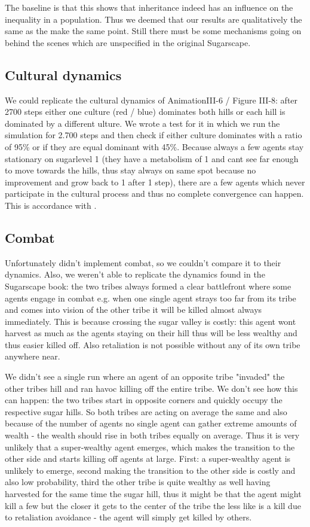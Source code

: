 The baseline is that this shows that inheritance indeed has an influence on the inequality in a population. Thus we deemed that our results are qualitatively the same as the make the same point. Still there must be some mechanisms going on behind the scenes which are unspecified in the original Sugarscape.

\subsection{Cultural dynamics}
We could replicate the cultural dynamics of AnimationIII-6 / Figure III-8: after 2700 steps either one culture (red / blue) dominates both hills or each hill is dominated by a different ulture. We wrote a test for it in which we run the simulation for 2.700 steps and then check if either culture dominates with a ratio of 95\% or if they are equal dominant with 45\%. Because always a few agents stay stationary on sugarlevel 1 (they have a metabolism of 1 and cant see far enough to move towards the hills, thus stay always on same spot because no improvement and grow back to 1 after 1 step), there are a few agents which never participate in the cultural process and thus no complete convergence can happen. This is accordance with \cite{weaver_replicating_2009}.

\subsection{Combat}
Unfortunately \cite{weaver_replicating_2009} didn't implement combat, so we couldn't compare it to their dynamics. Also, we weren't able to replicate the dynamics found in the Sugarscape book: the two tribes always formed a clear battlefront where some agents engage in combat e.g. when one single agent strays too far from its tribe and comes into vision of the other tribe it will be killed almost always immediately. This is because crossing the sugar valley is costly: this agent wont harvest as much as the agents staying on their hill thus will be less wealthy and thus easier killed off. Also retaliation is not possible without any of its own tribe anywhere near.

We didn't see a single run where an agent of an opposite tribe "invaded" the other tribes hill and ran havoc killing off the entire tribe. We don't see how this can happen: the two tribes start in opposite corners and quickly occupy the respective sugar hills. So both tribes are acting on average the same and also because of the number of agents no single agent can gather extreme amounts of wealth - the wealth should rise in both tribes equally on average. Thus it is very unlikely that a super-wealthy agent emerges, which makes the transition to the other side and starts killing off agents at large. First: a super-wealthy agent is unlikely to emerge, second making the transition to the other side is costly and also low probability, third the other tribe is quite wealthy as well having harvested for the same time the sugar hill, thus it might be that the agent might kill a few but the closer it gets to the center of the tribe the less like is a kill due to retaliation avoidance - the agent will simply get killed by others.

